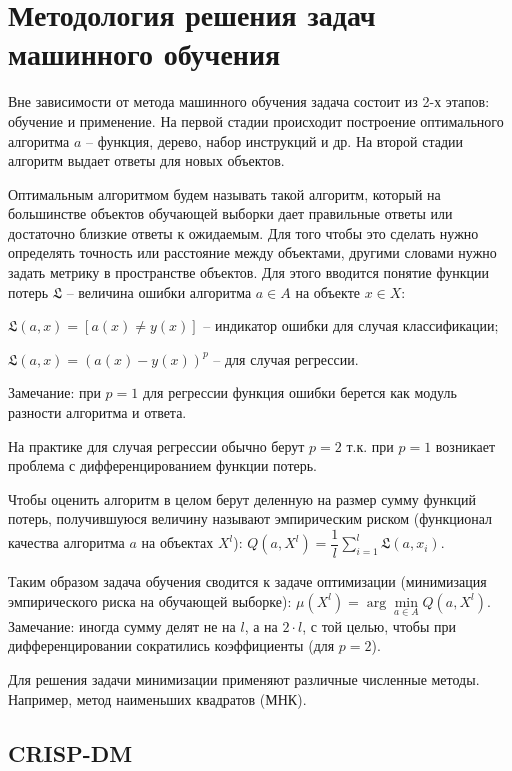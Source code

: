 \section{Методология решения задач машинного обучения}

Вне зависимости от метода машинного обучения задача состоит из 2-х этапов: обучение и применение.
На первой стадии происходит построение оптимального алгоритма $a$ -- функция, дерево, набор инструкций и др. На второй стадии алгоритм выдает ответы для новых объектов.

Оптимальным алгоритмом будем называть такой алгоритм, который на большинстве объектов обучающей выборки дает правильные ответы или достаточно близкие ответы к ожидаемым. Для того чтобы это сделать нужно определять точность или расстояние между объектами, другими словами нужно задать метрику в пространстве объектов. Для этого вводится понятие функции потерь $\mathfrak{L}$ -- величина ошибки алгоритма $a \in A$ на объекте $x \in X$:
\begin{description}[font=$\bullet$]
    \item $\mathfrak{L} (a,x)=[a(x) \neq y(x)]$ -- индикатор ошибки для случая классификации;
    \item $\mathfrak{L} (a,x)= (a(x) - y(x))^p$ -- для случая регрессии.
\end{description}
Замечание: при $p=1$ для регрессии функция ошибки берется как модуль разности алгоритма и ответа.

На практике для случая регрессии обычно берут $p=2$ т.к. при $p=1$ возникает проблема с дифференцированием функции потерь. 

Чтобы оценить алгоритм в целом берут деленную на размер сумму функций потерь, получившуюся величину называют эмпирическим риском (функционал качества алгоритма $a$ на объектах $X^l$): $Q(a, X^l) = \dfrac{1}{l}\sum\limits_{i=1}^{l}\mathfrak{L}(a,x_i)$.

Таким образом задача обучения сводится к задаче оптимизации (минимизация эмпирического риска на обучающей выборке): $\mu(X^l) = \arg\min\limits_{a \in A} Q(a,X^l)$.\\
Замечание: иногда сумму делят не на $l$, а на $2 \cdot l$, с той целью, чтобы при дифференцировании сократились коэффициенты (для $p=2$).

Для решения задачи минимизации применяют различные численные методы. Например, метод наименьших квадратов (МНК).


\subsection{CRISP-DM}

